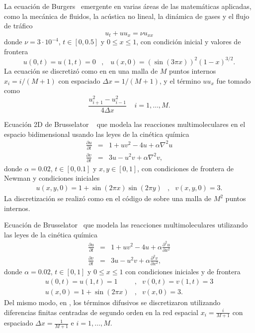 \begin{example}\label{ex:Burgers}
     La ecuación de Burgers~\cite{tokman2006efficient} emergente en varias áreas de las matemáticas aplicadas, como la mecánica de fluidos, la acústica no lineal, la dinámica de gases y el flujo de tráfico
    \[ u_t+uu_x=\nu u_{xx} \]
    donde $\nu = 3\cdot10^{-4}$, $t\in [0,0\mathord{.}5]$ y $0\leq x\leq 1$, con condición inicial y valores de frontera
    \begin{equation*}
    u(0,t)=u(1,t)=0 \;\;\; ,   \;\;\;  u(x,0)=(\sin(3\pi x))^{2}(1-x)^{3/2}.
    \end{equation*}
    La ecuación se discretizó como en \cite{tokman2006efficient} en una malla de $M$ puntos internos $x_i = i/(M+1)$ con espaciado $\Delta x=1/(M+1)$, y el término $uu_x$ fue tomado como
    \[ \frac{u_{i+1}^{2}-u_{i-1}^{2}}{4\Delta x} \;\;\;\;  i=1,\ldots,M.\]
\end{example}

\begin{example}\label{ex:Brus2D}
    Ecuación 2D de Brusselator ~\cite{lefever1971chemical,tokman2012new} que modela las reacciones multimoleculares en el espacio bidimensional usando las leyes de la cinética química
    \begin{eqnarray*}
        \frac{\partial u}{\partial t} &=&1+uv^{2}-4u+\alpha \nabla^{2}u\\
        \frac{\partial v}{\partial t}&=&3u-u^{2}v+\alpha \nabla^{2}v,
    \end{eqnarray*}
    donde $\alpha = 0\mathord{.}02$, $t\in[0, 0\mathord{.}1]$ y $x,y\in[0,1]$,
    con condiciones de frontera de Newman y condiciones iniciales
    \begin{eqnarray*}
        u(x,y,0)=1+\sin(2\pi x)\sin(2\pi y) &,& v(x,y,0)=3.
    \end{eqnarray*}
    La discretización se realizó como en el código de \cite{jansing2011expode} sobre una malla de $M^2$ puntos internos.
\end{example}

\begin{example}\label{ex:Brus}
    Ecuación de Brusselator~\cite{lefever1971chemical,tokman2006efficient} que modela las reacciones multimoleculares utilizando las leyes de la cinética química
    \begin{eqnarray*}
        \frac{\partial u}{\partial t}&=&1+uv^{2}-4u+\alpha \frac{\partial ^{2}u}{\partial x^{2}}\\
        \frac{\partial v}{\partial t}&=&3u-u^{2}v+\alpha \frac{\partial ^{2}v}{\partial x^{2}},
    \end{eqnarray*}
    donde $\alpha = 0\mathord{.}02$, $t\in [0,1]$ y $0\leq x \leq 1$ con condiciones iniciales y de frontera
    \begin{eqnarray*}
        u(0,t)=u(1,t)=1 &,& v(0,t)=v(1,t)=3\\
        u(x,0)=1+\sin(2\pi x) &,& v(x,0)=3 .
    \end{eqnarray*}
    Del mismo modo, en \cite{tokman2006efficient}, los términos difusivos se discretizaron utilizando diferencias finitas centradas de segundo orden en la red espacial $x_i=\frac{i}{M+1}$ con espaciado  $\Delta x = \frac{1}{M+1}$ e $i=1,\ldots,M$.
\end{example}

